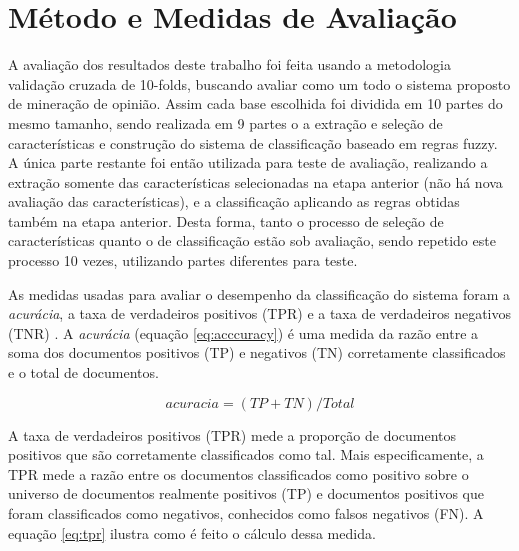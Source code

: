 \documentclass[template.tex]{subfiles}
\begin{document}
\section{Método e Medidas de Avaliação}

A avaliação dos resultados deste trabalho foi feita usando a metodologia validação cruzada de 10-folds, buscando avaliar como um todo o sistema proposto de mineração de opinião. Assim cada base escolhida foi dividida em 10 partes do mesmo tamanho, sendo realizada em 9 partes o a extração e seleção de características e construção do sistema de classificação baseado em regras fuzzy. A única parte restante foi então utilizada para teste de avaliação, realizando a extração somente das características selecionadas na etapa anterior (não há nova avaliação das características), e a classificação aplicando as regras obtidas também na etapa anterior. Desta forma, tanto o processo de seleção de características quanto o de classificação estão sob avaliação, sendo repetido este processo 10 vezes, utilizando partes diferentes para teste.




As medidas usadas para avaliar o desempenho da classificação do sistema foram a \textit{acurácia}, a taxa de verdadeiros positivos (TPR) e a taxa de verdadeiros negativos (TNR) \cite{fawcett2006introduction}. A \textit{acurácia} (equação \ref{eq:acccuracy}) é uma medida da razão entre a soma dos documentos positivos (TP) e negativos (TN) corretamente classificados e o total de documentos.

\begin{equation}
acuracia =  (TP + TN) / Total
\label{eq:acccuracy}
\end{equation}

A taxa de verdadeiros positivos (TPR) mede a proporção de documentos positivos que são corretamente classificados como tal. Mais especificamente, a TPR mede a razão entre os documentos classificados como positivo sobre o universo de documentos realmente positivos (TP) e documentos positivos que foram classificados como negativos, conhecidos como falsos negativos (FN). A equação \ref{eq:tpr} ilustra como é feito o cálculo dessa medida. 
\end{document}
